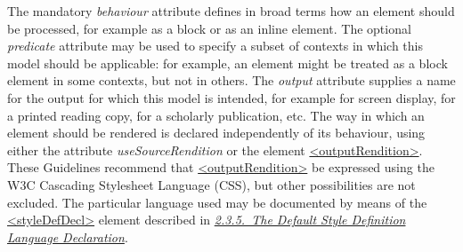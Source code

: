  The mandatory {\itshape behaviour} attribute defines in broad terms how an element should be processed, for example as a block or as an inline element. The optional {\itshape predicate} attribute may be used to specify a subset of contexts in which this model should be applicable: for example, an element might be treated as a block element in some contexts, but not in others. The {\itshape output} attribute supplies a name for the output for which this model is intended, for example for screen display, for a printed reading copy, for a scholarly publication, etc. The way in which an element should be rendered is declared independently of its behaviour, using either the attribute {\itshape useSourceRendition} or the element \hyperref[TEI.outputRendition]{<outputRendition>}. These Guidelines recommend that \hyperref[TEI.outputRendition]{<outputRendition>} be expressed using the W3C Cascading Stylesheet Language (CSS), but other possibilities are not excluded. The particular language used may be documented by means of the \hyperref[TEI.styleDefDecl]{<styleDefDecl>} element described in \textit{\hyperref[HD57-1a]{2.3.5.\ The Default Style Definition Language Declaration}}. 
